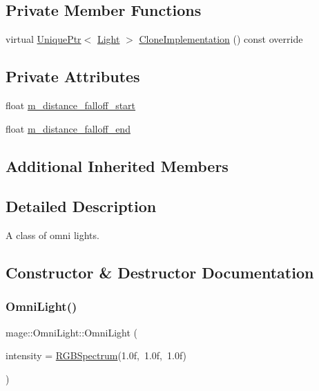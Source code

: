 \subsection*{Private Member Functions}
\begin{DoxyCompactItemize}
\item 
virtual \hyperlink{namespacemage_a8c307fbcc33bce9b7f2aa4c26c3b95cf}{Unique\+Ptr}$<$ \hyperlink{classmage_1_1_light}{Light} $>$ \hyperlink{classmage_1_1_omni_light_a1212457828cdd96cc7170767b7bd1223}{Clone\+Implementation} () const override
\end{DoxyCompactItemize}
\subsection*{Private Attributes}
\begin{DoxyCompactItemize}
\item 
float \hyperlink{classmage_1_1_omni_light_ab784744d39ad3d4f4a7b2214a55108f7}{m\+\_\+distance\+\_\+falloff\+\_\+start}
\item 
float \hyperlink{classmage_1_1_omni_light_a4ee5cc4103305dc96b43d6286858ef74}{m\+\_\+distance\+\_\+falloff\+\_\+end}
\end{DoxyCompactItemize}
\subsection*{Additional Inherited Members}


\subsection{Detailed Description}
A class of omni lights. 

\subsection{Constructor \& Destructor Documentation}
\hypertarget{classmage_1_1_omni_light_a94794dd7c19fcac0c0d0b9d83108513b}{}\label{classmage_1_1_omni_light_a94794dd7c19fcac0c0d0b9d83108513b} 
\subsubsection{\texorpdfstring{Omni\+Light()}{OmniLight()}\hspace{0.1cm}{\footnotesize\ttfamily [1/3]}}
{\footnotesize\ttfamily mage\+::\+Omni\+Light\+::\+Omni\+Light (\begin{DoxyParamCaption}\item[{const \hyperlink{structmage_1_1_r_g_b_spectrum}{R\+G\+B\+Spectrum} \&}]{intensity = {\ttfamily \hyperlink{structmage_1_1_r_g_b_spectrum}{R\+G\+B\+Spectrum}(1.0f,~1.0f,~1.0f)} }\end{DoxyParamCaption})\hspace{0.3cm}{\ttfamily [explicit]}}

